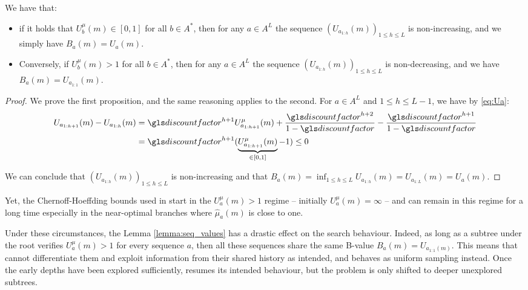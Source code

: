 \begin{lemma}
	\label{lemma:seq_values}
	\begin{leftbar}[lemmabar]
	We have that:
	\begin{itemize}
	\item if it holds that $U^{\mu}_b(m) \in [0, 1]$ for all $b\in A^{\ast}$, then for any $a\in A^L$ the sequence $(U_{a_{1:h}}(m))_{1\leq h \leq L}$ is non-increasing, and we simply have $B_a(m) = U_a(m)$.
	\item Conversely, if $U^{\mu}_b(m) > 1$ for all $b\in A^{\ast}$, then for any $a\in A^L$ the sequence $(U_{a_{1:h}}(m))_{1\leq h \leq L}$ is non-decreasing, and we have $B_a(m) = U_{a_{1:1}}(m)$.
	\end{itemize}
	\end{leftbar}
\end{lemma}

\begin{proof}
	We prove the first proposition, and the same reasoning applies to the second. For $a\in A^L$ and $1 \leq h \leq L - 1$, we have by \eqref{eq:Ua}:
	\begin{align*}
	U_{a_{1:h+1}}(m) - U_{a_{1:h}}(m) &= \discount^{h+1}U^{\mu}_{a_{1:h+1}}(m) + \frac{\discount^{h+2}}{1-\discount} - \frac{\discount^{h+1}}{1-\discount}\\
	&= \discount^{h+1}(\underbrace{U^{\mu}_{a_{1:h+1}}(m)}_{\in [0, 1]} - 1) \leq 0
	\end{align*}
	
	\noindent
	We can conclude that $(U_{a_{1:h}}(m))_{1\leq h \leq L}$ is non-increasing and that $B_a(m) = \inf_{1 \leq h \leq L} U_{a_{1:h}}(m) = U_{a_{1:L}}(m) = U_a(m)$.
\end{proof}

Yet, the Chernoff-Hoeffding bounds used in \OLOP start in the $U^{\mu}_a(m) > 1$ regime -- initially $U^{\mu}_a(m) = \infty$ -- and can remain in this regime for a long time especially in the near-optimal branches where $\hat{\mu}_a(m)$ is close to one.

Under these circumstances, the Lemma \ref{lemma:seq_values} has a drastic effect on the search behaviour. Indeed, as long as a subtree under the root verifies $U^{\mu}_a(m) > 1$ for every sequence $a$, then all these sequences share the same B-value $B_a(m) = U_{a_{1:1}(m)}$. This means that \OLOP cannot differentiate them and exploit information from their shared history as intended, and behaves as uniform sampling instead.
Once the early depths have been explored sufficiently, \OLOP resumes its intended behaviour, but the problem is only shifted to deeper unexplored subtrees.

